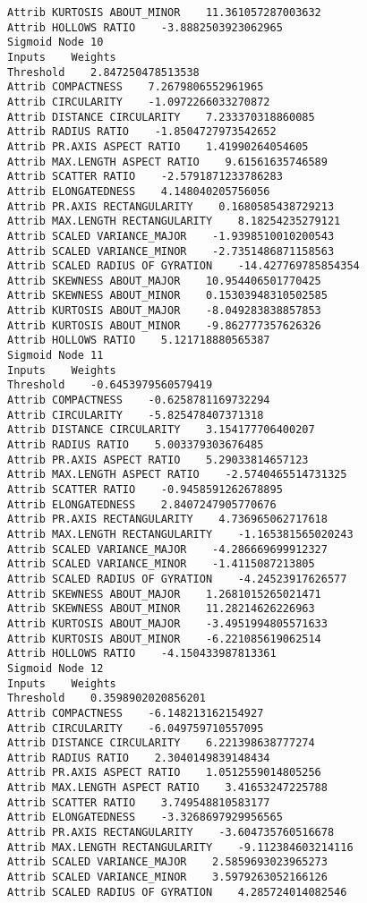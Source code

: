 \documentclass[
	article,			%
	11pt,				%
	oneside,			%
	a4paper,			%
	english,			%
	brazil,				%
	sumario=tradicional
	]{abntex2}
\begin{document}
\begin{lstlisting}
Attrib KURTOSIS ABOUT_MINOR    11.361057287003632
Attrib HOLLOWS RATIO    -3.8882503923062965
Sigmoid Node 10
Inputs    Weights
Threshold    2.847250478513538
Attrib COMPACTNESS    7.2679806552961965
Attrib CIRCULARITY    -1.0972266033270872
Attrib DISTANCE CIRCULARITY    7.233370318860085
Attrib RADIUS RATIO    -1.8504727973542652
Attrib PR.AXIS ASPECT RATIO    1.41990264054605
Attrib MAX.LENGTH ASPECT RATIO    9.61561635746589
Attrib SCATTER RATIO    -2.5791871233786283
Attrib ELONGATEDNESS    4.148040205756056
Attrib PR.AXIS RECTANGULARITY    0.1680585438729213
Attrib MAX.LENGTH RECTANGULARITY    8.18254235279121
Attrib SCALED VARIANCE_MAJOR    -1.9398510010200543
Attrib SCALED VARIANCE_MINOR    -2.7351486871158563
Attrib SCALED RADIUS OF GYRATION    -14.427769785854354
Attrib SKEWNESS ABOUT_MAJOR    10.954406501770425
Attrib SKEWNESS ABOUT_MINOR    0.15303948310502585
Attrib KURTOSIS ABOUT_MAJOR    -8.049283838857853
Attrib KURTOSIS ABOUT_MINOR    -9.862777357626326
Attrib HOLLOWS RATIO    5.121718880565387
Sigmoid Node 11
Inputs    Weights
Threshold    -0.6453979560579419
Attrib COMPACTNESS    -0.6258781169732294
Attrib CIRCULARITY    -5.825478407371318
Attrib DISTANCE CIRCULARITY    3.154177706400207
Attrib RADIUS RATIO    5.003379303676485
Attrib PR.AXIS ASPECT RATIO    5.29033814657123
Attrib MAX.LENGTH ASPECT RATIO    -2.5740465514731325
Attrib SCATTER RATIO    -0.9458591262678895
Attrib ELONGATEDNESS    2.8407247905770676
Attrib PR.AXIS RECTANGULARITY    4.736965062717618
Attrib MAX.LENGTH RECTANGULARITY    -1.165381565020243
Attrib SCALED VARIANCE_MAJOR    -4.286669699912327
Attrib SCALED VARIANCE_MINOR    -1.4115087213805
Attrib SCALED RADIUS OF GYRATION    -4.24523917626577
Attrib SKEWNESS ABOUT_MAJOR    1.2681015265021471
Attrib SKEWNESS ABOUT_MINOR    11.28214626226963
Attrib KURTOSIS ABOUT_MAJOR    -3.4951994805571633
Attrib KURTOSIS ABOUT_MINOR    -6.221085619062514
Attrib HOLLOWS RATIO    -4.150433987813361
Sigmoid Node 12
Inputs    Weights
Threshold    0.3598902020856201
Attrib COMPACTNESS    -6.148213162154927
Attrib CIRCULARITY    -6.049759710557095
Attrib DISTANCE CIRCULARITY    6.221398638777274
Attrib RADIUS RATIO    2.3040149839148434
Attrib PR.AXIS ASPECT RATIO    1.0512559014805256
Attrib MAX.LENGTH ASPECT RATIO    3.41653247225788
Attrib SCATTER RATIO    3.749548810583177
Attrib ELONGATEDNESS    -3.3268697929956565
Attrib PR.AXIS RECTANGULARITY    -3.604735760516678
Attrib MAX.LENGTH RECTANGULARITY    -9.112384603214116
Attrib SCALED VARIANCE_MAJOR    2.5859693023965273
Attrib SCALED VARIANCE_MINOR    3.5979263052166126
Attrib SCALED RADIUS OF GYRATION    4.285724014082546

\end{lstlisting}
\end{document}
